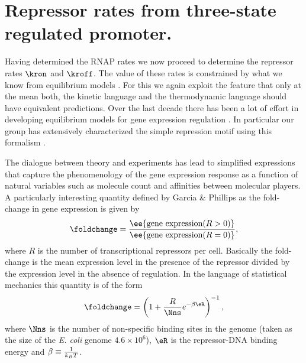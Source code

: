 \section{Repressor rates from three-state regulated promoter.}

Having determined the RNAP rates we now proceed to determine the repressor rates
$\kron$ and $\kroff$. The value of these rates is constrained by what we know
from equilibrium models \cite{Phillips2015}. For this we again exploit the
feature that only at the mean both, the kinetic language and the thermodynamic
language should have equivalent predictions. Over the last decade there has been
a lot of effort in developing equilibrium models for gene expression regulation
\cite{Buchler2003,Vilar2011,Bintu2005a}. In particular our group has extensively
characterized the simple repression motif using this formalism
\cite{Garcia2011c,Brewster2014,Razo-Mejia2018}.

The dialogue between theory and experiments has lead to simplified expressions
that capture the phenomenology of the gene expression response as a function of
natural variables such as molecule count and affinities between molecular
players. A particularly interesting quantity defined by Garcia \& Phillips
\cite{Garcia2011c} as the fold-change in gene expression is given by
\begin{equation}
  \foldchange = {\ee{\text{gene expression}(R > 0)} \over
                 \ee{\text{gene expression}(R = 0)}},
\end{equation}
where $R$ is the number of transcriptional repressors per cell. Basically the
fold-change is the mean expression level in the presence of the repressor
divided by the expression level in the absence of regulation. In the language of
statistical mechanics this quantity is of the form \cite{Garcia2011c}
\begin{equation}
  \foldchange = \left( 1 + {R \over \Nns} e^{-\beta\eR} \right)^{-1},
  \label{seq_fc_thermo}
\end{equation}
where $\Nns$ is the number of non-specific binding sites in the genome (taken
as the size of the \textit{E. coli} genome $4.6\times 10^6$), $\eR$ is the
repressor-DNA binding energy and $\beta \equiv {1 \over k_BT}$.

